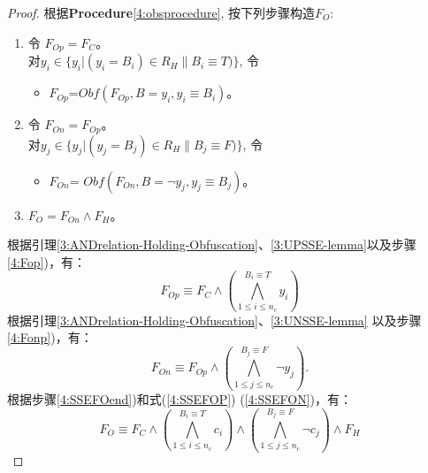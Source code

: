 \begin{proof}

根据\textbf{Procedure}\ref{4:obsprocedure}, 按下列步骤构造$F_O$:
\begin{enumerate}
\item \label{4:Fop}
令 $F_{Op}=F_C$。  \\
对$y_i \in \{y_i|(y_i=B_{i})\in R_H \parallel B_i\equiv T)\}$, 令
\begin{itemize}
 \item[] $F_{Op}$=$Obf(F_{Op},B=y_i,{y_i\equiv B_i})$。
\end{itemize}
\item  \label{4:Fonp}
令 $F_{On}=F_{Op}$。 \\
对$y_j \in \{y_j|(y_j=B_j)\in R_H \parallel B_j\equiv F)\}$, 令
\begin{itemize}
 \item[] $F_{On}$= $Obf(F_{On},B=\neg y_j,{y_j\equiv B_j})$。
\end{itemize}
\item  \label{4:SSEFOend}
$F_{O}=F_{On}\wedge F_H$。
\end{enumerate}
根据引理\ref{3:ANDrelation-Holding-Obfuscation}、\ref{3:UPSSE-lemma}以及步骤\ref{4:Fop})，有：
\begin{equation}\label{4:SSEFOP}
F_{Op} \equiv F_C\wedge (\bigwedge_{1\leqslant i\leqslant n_c}^{B_i \equiv T}y_i)
\end{equation}
根据引理\ref{3:ANDrelation-Holding-Obfuscation}、\ref{3:UNSSE-lemma} 以及步骤\ref{4:Fonp})，有：
\begin{equation}\label{4:SSEFON}
F_{On} \equiv F_{Op}\wedge (\bigwedge_{1\leqslant j\leqslant n_c}^{B_j \equiv F}\neg y_j).
\end{equation}
根据步骤\ref{4:SSEFOend})和式(\ref{4:SSEFOP}) (\ref{4:SSEFON})，有：
\begin{equation}\label{4:SSEFO}
F_{O} \equiv F_C \wedge
(\bigwedge_{1\leqslant i\leqslant n_c}^{B_i \equiv T}c_i)\wedge
(\bigwedge_{1\leqslant j\leqslant n_c}^{B_j \equiv F}\neg c_j) \wedge F_H
\end{equation}


\end{proof}
